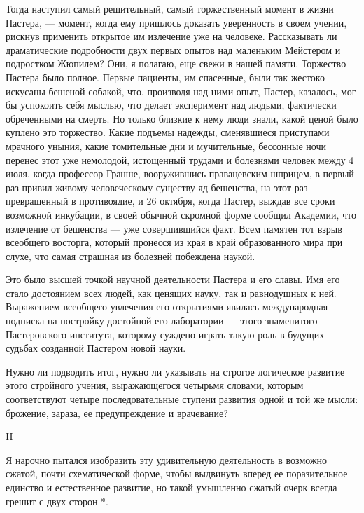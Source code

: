 Тогда наступил  самый решительный,  самый торжественный  момент в  жизни
Пастера, ---  момент,  когда ему  пришлось  доказать уверенность  в  своем
учении,  рискнув  применить  открытое  им  излечение  уже  на  человеке.
Рассказывать  ли  драматические  подробности  двух  первых  опытов   над
маленьким Мейстером и подростком  Жюпилем? Они, я  полагаю, еще свежи  в
нашей  памяти.  Торжество  Пастера  было  полное.  Первые  пациенты,  им
спасенные, были так жестоко искусаны бешеной собакой, что, производя над
ними опыт, Пастер, казалось,  мог бы успокоить  себя мыслью, что  делает
эксперимент над  людьми, фактически  обреченными  на смерть.  Но  только
близкие к нему люди знали, какой ценой было куплено это торжество. Какие
подъемы  надежды,   сменявшиеся   приступами  мрачного   уныния,   какие
томительные  дни  и  мучительные,   бессонные  ночи  перенес  этот   уже
немолодой, истощенный трудами  и болезнями человек  между 4 июля,  когда
профессор Гранше, вооружившись правацевским шприцем, в первый раз привил
живому человеческому существу яд бешенства,  на этот раз превращенный  в
противоядие, и  26 октября,  когда Пастер,  выждав все  сроки  возможной
инкубации,  в  своей  обычной  скромной  форме  сообщил  Академии,   что
излечение от бешенства --- уже совершившийся факт. Всем памятен тот  взрыв
всеобщего восторга, который пронесся из  края в край образованного  мира
при слухе, что самая страшная из болезней побеждена наукой.

Это было высшей точкой научной деятельности Пастера и его славы. Имя его
стало достоянием всех людей, как ценящих науку, так и равнодушных к ней.
Выражением всеобщего  увлечения  его  открытиями  явилась  международная
подписка на  постройку достойной  его  лаборатории ---  этого  знаменитого
Пастеровского института, которому  суждено играть такую  роль в  будущих
судьбах созданной Пастером новой науки.

Нужно ли  подводить  итог,  нужно ли  указывать  на  строгое  логическое
развитие этого стройного учения, выражающегося четырьмя словами, которым
соответствуют четыре последовательные  ступени развития одной  и той  же
мысли: брожение, зараза, ее предупреждение и врачевание?

II

Я нарочно пытался  изобразить эту удивительную  деятельность в  возможно
сжатой,  почти   схематической   форме,  чтобы   выдвинуть   вперед   ее
поразительное единство  и  естественное  развитие,  но  такой  умышленно
сжатый очерк всегда грешит с двух сторон *.

